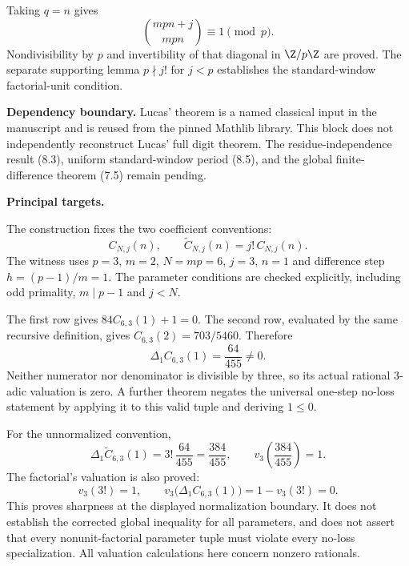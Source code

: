 Taking $q=n$ gives
\[
 \binom{mpn+j}{mpn}\equiv1\pmod p.
\]
Nondivisibility by $p$ and invertibility of that diagonal in $\Z/p\Z$ are proved. The separate supporting lemma $p\nmid j!$ for $j<p$ establishes the standard-window factorial-unit condition.

\textbf{Dependency boundary.} Lucas' theorem is a named classical input in the manuscript and is reused from the pinned Mathlib library. This block does not independently reconstruct Lucas' full digit theorem. The residue-independence result (8.3), uniform standard-window period (8.5), and the global finite-difference theorem (7.5) remain pending.

\textbf{Principal targets.}\par
{}\par
{}\par
{}\par
{}
\par\medskip
{}
The construction fixes the two coefficient conventions:
\[
 C_{N,j}(n),\qquad \widetilde C_{N,j}(n)=j!\,C_{N,j}(n).
\]
The witness uses $p=3$, $m=2$, $N=mp=6$, $j=3$, $n=1$ and difference step $h=(p-1)/m=1$. The parameter conditions are checked explicitly, including odd primality, $m\mid p-1$ and $j<N$.

The first row gives $84C_{6,3}(1)+1=0$. The second row, evaluated by the same recursive definition, gives $C_{6,3}(2)=703/5460$. Therefore
\[
 \Delta_1 C_{6,3}(1)=\frac{64}{455}\ne0.
\]
Neither numerator nor denominator is divisible by three, so its actual rational 3-adic valuation is zero. A further theorem negates the universal one-step no-loss statement by applying it to this valid tuple and deriving $1\le0$.

For the unnormalized convention,
\[
 \Delta_1\widetilde C_{6,3}(1)=3!\,\frac{64}{455}=\frac{384}{455},
 \qquad v_3\!\left(\frac{384}{455}\right)=1.
\]
The factorial's valuation is also proved:
\[
 v_3(3!)=1,\qquad
 v_3\bigl(\Delta_1C_{6,3}(1)\bigr)
 =1-v_3(3!)=0.
\]
This proves sharpness at the displayed normalization boundary. It does not establish the corrected global inequality for all parameters, and does not assert that every nonunit-factorial parameter tuple must violate every no-loss specialization. All valuation calculations here concern nonzero rationals.

